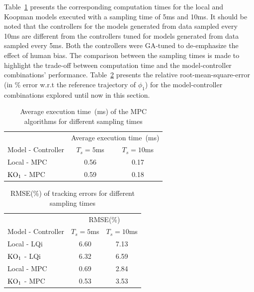 % 
Table~\ref{tab:Exec_1} presents the corresponding computation times for the local and Koopman models executed with a sampling time of 5ms and 10ms. It should be noted that the controllers for the models generated from data sampled every 10ms are different from the controllers tuned for models generated from data sampled every 5ms. Both the controllers were GA-tuned to de-emphasize the effect of human bias. The comparison between the sampling times is made to highlight the trade-off between computation time and the model-controller combinations' performance. Table~\ref{tab:RMSE_1} presents the relative root-mean-square-error (in \% error w.r.t the reference trajectory of $\phi_1$) for the model-controller combinations explored until now in this section.
% 
\begin{table}[H]
    \centering
    \begin{tabular}{lcc}
         \toprule
                                  & \multicolumn{2}{c}{Average execution time~(ms)}\\
        \cmidrule{2-3}
         Model - Controller       & $T_s = 5$ms  & $T_s = 10$ms\\
         \midrule
         Local - MPC               & 0.56        & 0.17\\
         $\textup{KO}_1$ - MPC    & 0.59         & 0.18\\
         \bottomrule
    \end{tabular}
    \caption{Average execution time~(ms) of the MPC algorithms for different sampling times}
    \label{tab:Exec_1}
\end{table}
% 
\begin{table}[H]
    \centering
    \begin{tabular}{lcc}
         \toprule
                                            & \multicolumn{2}{c}{RMSE(\%)}\\
        \cmidrule{2-3}
         Model - Controller                  & $T_s = 5$ms & $T_s = 10$ms\\
         \midrule
         Local - LQi                         & 6.60       & 7.13\\
         $\textup{KO}_1$ - LQi               & 6.32       & 6.59 \\
         Local - MPC                         & 0.69       & 2.84\\
         $\textup{KO}_1$ - MPC               & 0.53       & 3.53\\
         \bottomrule
    \end{tabular}
    \caption{RMSE(\%) of tracking errors for different sampling times}
    \label{tab:RMSE_1}
\end{table}
